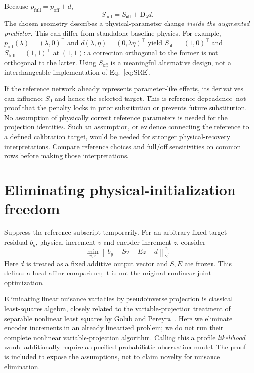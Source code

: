 \documentclass[11pt,a4paper]{article}
\newcommand{\D}{\mathrm D}
\newcommand{\norm}[1]{\left\lVert#1\right\rVert}
\newcommand{\full}{\mathrm{full}}
\newcommand{\off}{\mathrm{off}}
\theoremstyle{remark}
\begin{document}
Because $p_\full=p_\off+d$,
\begin{equation}\label{eq:full-off-s}
 S_\full=S_\off+\D_\lambda d.
\end{equation}
The chosen geometry describes a physical-parameter change \emph{inside the augmented predictor}. This can differ from standalone-baseline physics. For example, $p_\off(\lambda)=(\lambda,0)^\top$ and $d(\lambda,\eta)=(0,\lambda\eta)^\top$ yield $S_\off=(1,0)^\top$ and $S_\full=(1,1)^\top$ at $(1,1)$: a correction orthogonal to the former is not orthogonal to the latter. Using $S_\off$ is a meaningful alternative design, not a interchangeable implementation of Eq.~\eqref{eq:SRE}.

If the reference network already represents parameter-like effects, its derivatives can influence $S_0$ and hence the selected target. This is reference dependence, not proof that the penalty locks in prior substitution or prevents future substitution. No assumption of physically correct reference parameters is needed for the projection identities. Such an assumption, or evidence connecting the reference to a defined calibration target, would be needed for stronger physical-recovery interpretations. Compare reference choices and full/off sensitivities on common rows before making those interpretations.

\section{Eliminating physical-initialization freedom}\label{sec:profiling}
Suppress the reference subscript temporarily. For an arbitrary fixed target residual $b_y$, physical increment $v$ and encoder increment $z$, consider
\begin{equation}\label{eq:localLS}
 \min_{v,z}\norm{b_y-Sv-Ez-d}_2^2.
\end{equation}
Here $d$ is treated as a fixed additive output vector and $S,E$ are frozen. This defines a local affine comparison; it is not the original nonlinear joint optimization.

Eliminating linear nuisance variables by pseudoinverse projection is classical least-squares algebra, closely related to the variable-projection treatment of separable nonlinear least squares by Golub and Pereyra~\cite{golub1973}. Here we eliminate encoder increments in an already linearized problem; we do not run their complete nonlinear variable-projection algorithm. Calling this a profile \emph{likelihood} would additionally require a specified probabilistic observation model. The proof is included to expose the assumptions, not to claim novelty for nuisance elimination.
\end{document}
